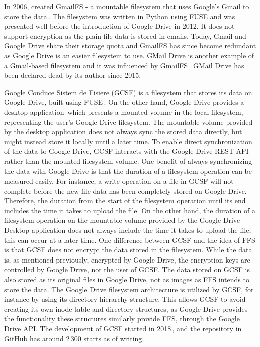 In 2006, \citeauthor{jonesGoogleHackUse2006} created GmailFS - a mountable filesystem that uses Google's Gmail to store the data\,\cite{jonesGoogleHackUse2006, jonesGmailFilesystemImplementation2006}. The filesystem was written in Python using FUSE and was presented well before the introduction of Google Drive in 2012. It does not support encryption as the plain file data is stored in emails. Today, Gmail and Google Drive share their storage quota and GmailFS has since become redundant as Google Drive is an easier filesystem to use. GMail Drive is another example of a Gmail-based filesystem and it was influenced by GmailFS\,\cite{viksoeViksoeDkGMail2004}. GMail Drive has been declared dead by its author since 2015.

Google Conduce Sistem de Fișiere (\gls{GCSF}) is a filesystem that stores its data on Google Drive, built using FUSE\,\cite{puscassergiudanGCSFVIRTUALFILE2018,puscasHarababurelGcsf2022}. On the other hand, Google Drive provides a desktop application\,\cite{googleInstallSetGoogle} which presents a mounted volume in the local filesystem, representing the user's Google Drive filesystem. The mountable volume provided by the desktop application does not always sync the stored data directly, but might instead store it locally until a later time. To enable direct synchronization of the data to Google Drive, GCSF interacts with the Google Drive REST API rather than the mounted filesystem volume. One benefit of always synchronizing the data with Google Drive is that the duration of a filesystem operation can be measured easily. For instance, a write operation on a file in GCSF will not complete before the new file data has been completely stored on Google Drive. Therefore, the duration from the start of the filesystem operation until its end includes the time it takes to upload the file. On the other hand, the duration of a filesystem operation on the mountable volume provided by the Google Drive Desktop application does not always include the time it takes to upload the file, this can occur at a later time. One difference between GCSF and the idea of FFS is that GCSF does not encrypt the data stored in the filesystem. While the data is, as mentioned previously, encrypted by Google Drive, the encryption keys are controlled by Google Drive, not the user of GCSF. The data stored on GCSF is also stored as its original files in Google Drive, not as images as FFS intends to store the data. The Google Drive filesystem architecture is utilized by GCSF, for instance by using its directory hierarchy structure. This allows GCSF to avoid creating its own inode table and directory structures, as Google Drive provides the functionality these structures similarly provide FFS, through the Google Drive API. The development of GCSF started in 2018\,\cite{puscasHarababurelGcsf2022}, and the repository in GitHub has around $2\,300$ starts as of writing. 

